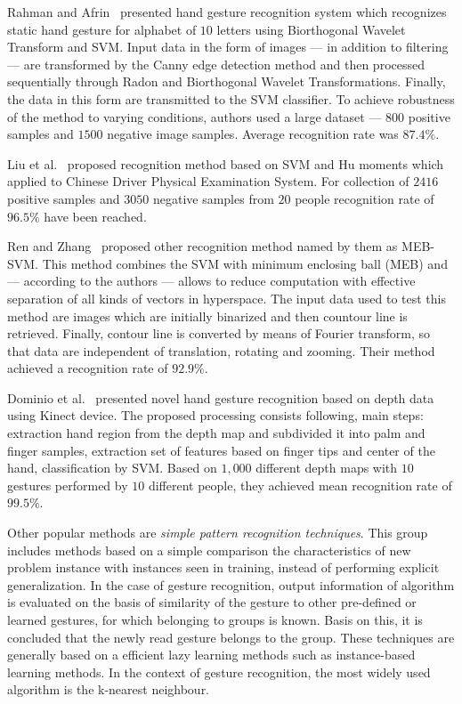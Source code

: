 Rahman and Afrin~\cite{RahmanHand} presented hand gesture recognition system which recognizes static hand gesture for alphabet of $10$ letters using Biorthogonal Wavelet Transform and SVM. Input data in the form of images --- in addition to filtering --- are transformed by the Canny edge detection method and then processed sequentially through Radon and Biorthogonal Wavelet Transformations. Finally, the data in this form are transmitted to the SVM classifier. To achieve robustness of the method to varying conditions, authors used a large dataset --- $800$ positive samples and $1500$ negative image samples. Average recognition rate was $87.4\%$.

Liu et al.~\cite{LiuStatic} proposed recognition method based on SVM and Hu moments which applied to Chinese Driver Physical Examination System. For collection of $2416$ positive samples and $3050$ negative samples from $20$ people recognition rate of $96.5\%$ have been reached.

Ren and Zhang~\cite{RenMEBSVM} proposed other recognition method named by them as MEB-SVM. This method combines the SVM with minimum enclosing ball (MEB) and --- according to the authors --- allows to reduce computation with effective separation of all kinds of vectors in hyperspace. The input data used to test this method are images which are initially binarized and then countour line is retrieved. Finally, contour line is converted by means of Fourier transform, so that data are independent of translation, rotating and zooming. Their method achieved a recognition rate of $92.9\%$.


Dominio et al.~\cite{Dominio:2013:HGR:2510650.2510651} presented novel hand gesture recognition based on depth data using Kinect device. The proposed processing consists following, main steps: extraction hand region from the depth map and subdivided it into palm and finger samples, extraction set of features based on finger tips and center of the hand, classification by SVM. Based on $1,000$ different depth maps with $10$ gestures performed by $10$ different people, they achieved mean recognition rate of $99.5\%$.

Other popular methods are \emph{simple pattern recognition techniques}. This group includes methods based on a simple comparison the characteristics of new problem instance with instances seen in training, instead of performing explicit generalization. In the case of gesture recognition, output information of algorithm is evaluated on the basis of similarity of the gesture to other pre-defined or learned gestures, for which belonging to groups is known. Basis on this, it is concluded that the newly read gesture belongs to the group. These techniques are generally based on a efficient lazy learning methods such as instance-based learning methods.  In the context of gesture recognition, the most widely used algorithm is the k-nearest neighbour.

